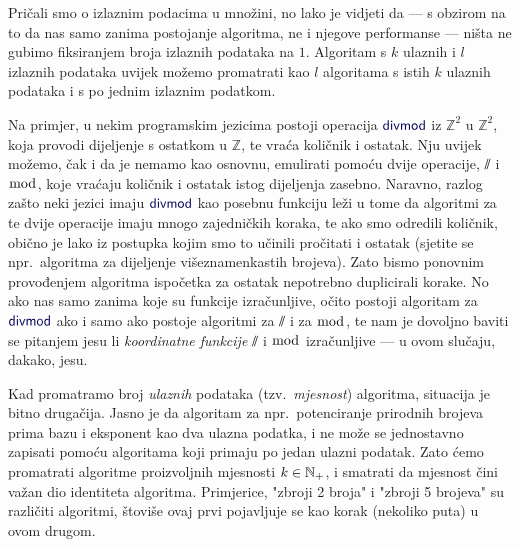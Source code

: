 
\begin{napomena}[{name=[samo jedan izlazni podatak]}]\label{nap:brip}
Pričali smo o izlaznim podacima u množini, no lako je vidjeti da --- s obzirom na to da nas samo zanima postojanje algoritma, ne i njegove performanse --- ništa ne gubimo fiksiranjem broja izlaznih podataka na $1$. Algoritam s $k$ ulaznih i $l$ izlaznih podataka uvijek možemo promatrati kao $l$ algoritama s istih $k$ ulaznih podataka i s po jednim izlaznim podatkom.

Na primjer, u nekim programskim jezicima postoji operacija $\f{divmod}$ iz $\mathbb Z^2$ u $\mathbb Z^2$, koja provodi dijeljenje s ostatkom u $\mathbb Z$, te vraća količnik i ostatak. Nju uvijek možemo, čak i da je nemamo kao osnovnu, emulirati pomoću dvije operacije, $\sslash$ i $\bmod$, koje vraćaju količnik i ostatak istog dijeljenja zasebno. Naravno, razlog zašto neki jezici imaju $\f{divmod}$ kao posebnu funkciju leži u tome da algoritmi za te dvije operacije imaju mnogo zajedničkih koraka, te ako smo odredili količnik, obično je lako iz postupka kojim smo to učinili pročitati i ostatak (sjetite se npr.\ algoritma za dijeljenje višeznamenkastih brojeva). Zato bismo ponovnim provođenjem algoritma ispočetka za ostatak nepotrebno duplicirali korake. No ako nas samo zanima koje su funkcije izračunljive, očito postoji algoritam za $\f{divmod}$ ako i samo ako postoje algoritmi za $\sslash$ i za $\bmod$, te nam je dovoljno baviti se pitanjem jesu li \emph{koordinatne funkcije} $\sslash$ i $\bmod$ izračunljive --- u ovom slučaju, dakako, jesu.
\end{napomena}

Kad promatramo broj \emph{ulaznih} podataka (tzv.\ \emph{mjesnost}) algoritma, situacija je bitno drugačija. Jasno je da algoritam za npr.\ potenciranje prirodnih brojeva prima bazu i eksponent kao dva ulazna podatka, i ne može se jednostavno zapisati pomoću algoritama koji primaju po jedan ulazni podatak. %
Zato ćemo promatrati algoritme proizvoljnih mjesnosti $k\in{\mathbb N}_+$, i smatrati da mjesnost čini važan dio identiteta algoritma. Primjerice, "zbroji 2 broja" i "zbroji 5 brojeva" su različiti algoritmi, štoviše ovaj prvi pojavljuje se kao korak (nekoliko puta) u ovom drugom.

